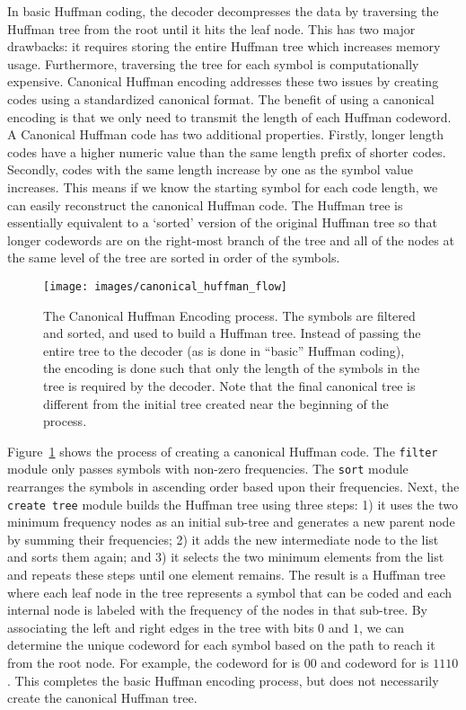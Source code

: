 In basic Huffman coding, the decoder decompresses the data by traversing the Huffman tree from the root until it hits the leaf node. This has two major drawbacks: it requires storing the entire Huffman tree which increases memory usage. Furthermore, traversing the tree for each symbol is computationally expensive. Canonical Huffman encoding addresses these two issues by creating codes using a standardized canonical format.  The benefit of using a canonical encoding is that we only need to transmit the length of each Huffman codeword.  A Canonical Huffman code has two additional properties.  Firstly, longer length codes have a higher numeric value than the same length prefix of shorter codes.  Secondly, codes with the same length increase by one as the symbol value increases. This means if we know the starting symbol for each code length, we can easily reconstruct the canonical Huffman code.  The Huffman tree is essentially equivalent to a `sorted' version of the original Huffman tree so that longer codewords are on the right-most branch of the tree and all of the nodes at the same level of the tree are sorted in order of the symbols.  

\begin{figure}
\centering
\texttt{[image: images/canonical\_huffman\_flow]}
\caption{ The Canonical Huffman Encoding process. The symbols are filtered and sorted, and used to build a Huffman tree. Instead of passing the entire tree to the decoder (as is done in ``basic'' Huffman coding), the encoding is done such that only the length of the symbols in the tree is required by the decoder. Note that the final canonical tree is different from the initial tree created near the beginning of the process.}
\label{fig:canonical_huffman_flow}
\end{figure}

Figure~\ref{fig:canonical_huffman_flow} shows the process of creating a canonical Huffman code. The \lstinline{filter} module only passes symbols with non-zero frequencies. The \lstinline{sort} module rearranges the symbols in ascending order based upon their frequencies. Next, the \lstinline{create tree} module builds the Huffman tree using three steps: 1) it uses the two minimum frequency nodes as an initial sub-tree and generates a new parent node by summing their frequencies; 2) it adds the new intermediate node to the list and sorts them again; and 3) it selects the two minimum elements from the list and repeats these steps until one element remains. The result is a Huffman tree where each leaf node in the tree represents a symbol that can be coded and each internal node is labeled with the frequency of the nodes in that sub-tree.  By associating the left and right edges in the tree with bits $0$ and $1$, we can determine the unique codeword for each symbol based on the path to reach it from the root node. For example, the codeword for  is $00$ and codeword for  is $1110$. This completes the basic Huffman encoding process, but does not necessarily create the canonical Huffman tree.

